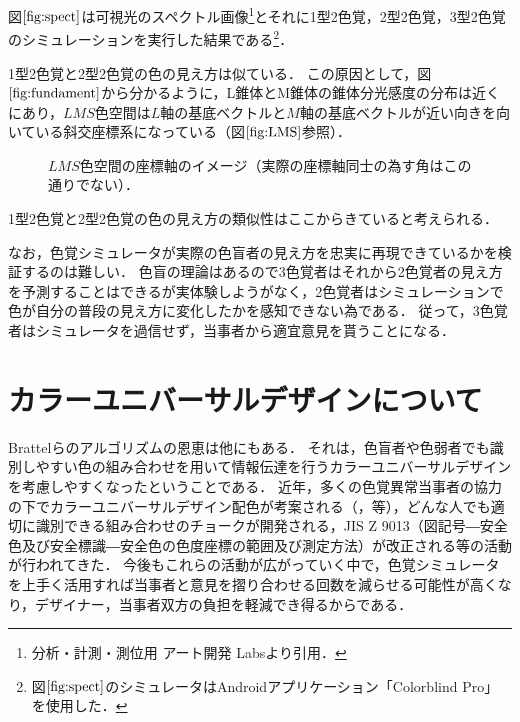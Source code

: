 \documentclass[uplatex,paper=a4,fontsize=4.0truemm,jafontsize=4.0truemm,head_space=30.0truemm,foot_space=30.0truemm,baselineskip=8.0truemm,line_length=40zw,gutter=25.0truemm,oneside,openany,fleqn,hanging_panctuation,open_bracket_pos=nibu_tentsuki,dvipdfmx,jis2004,book,titlepage]{jlreq}
\theoremstyle{mystyle}
\newcommand{\captiondot}[1]{\caption{#1．}}
\newcommand{\mathdisplaystyle}[1]{\(\displaystyle{#1}\)}
\newcommand{\Reference}[1]{\mathdisplaystyle{\ref{#1}}}
\begin{document}
			図\Reference{fig:spect}は可視光のスペクトル画像\footnote{分析・計測・測位用 アート開発 Labs\protect\cite{Artlabs2019}より引用．}とそれに1型2色覚，2型2色覚，3型2色覚のシミュレーションを実行した結果である\footnote{図\protect\Reference{fig:spect}のシミュレータはAndroidアプリケーション「Colorblind Pro」を使用した．}．
			
			1型2色覚と2型2色覚の色の見え方は似ている．
			この原因として，図\Reference{fig:fundament}から分かるように，L錐体とM錐体の錐体分光感度の分布は近くにあり，\mathdisplaystyle{LMS}色空間は\mathdisplaystyle{L}軸の基底ベクトルと\mathdisplaystyle{M}軸の基底ベクトルが近い向きを向いている斜交座標系になっている（図\Reference{fig:LMS}参照）．
			\begin{figure}[tbp]
				\centering
				\captiondot{\protect\mathdisplaystyle{LMS}色空間の座標軸のイメージ（実際の座標軸同士の為す角はこの通りでない）}\label{fig:LMS}
			\end{figure}
			1型2色覚と2型2色覚の色の見え方の類似性はここからきていると考えられる．

			なお，色覚シミュレータが実際の色盲者の見え方を忠実に再現できているかを検証するのは難しい．
			色盲の理論はあるので3色覚者はそれから2色覚者の見え方を予測することはできるが実体験しようがなく，2色覚者はシミュレーションで色が自分の普段の見え方に変化したかを感知できない為である．
			従って，3色覚者はシミュレータを過信せず，当事者から適宜意見を貰うことになる．
		\section{カラーユニバーサルデザインについて}
			Brattelらのアルゴリズムの恩恵は他にもある．
			それは，色盲者や色弱者でも識別しやすい色の組み合わせを用いて情報伝達を行うカラーユニバーサルデザインを考慮しやすくなったということである．
			近年，多くの色覚異常当事者の協力の下でカラーユニバーサルデザイン配色が考案される（\cite[pp.~1091--1099]{Okabe2002c}，\cite{cudo2018}等），どんな人でも適切に識別できる組み合わせのチョークが開発される\cite{Rikagaku2020}，JIS Z 9013（図記号―安全色及び安全標識―安全色の色度座標の範囲及び測定方法）が改正される\cite{Nakano2018}等の活動が行われてきた．
			今後もこれらの活動が広がっていく中で，色覚シミュレータを上手く活用すれば当事者と意見を摺り合わせる回数を減らせる可能性が高くなり，デザイナー，当事者双方の負担を軽減でき得るからである．
\end{document}
